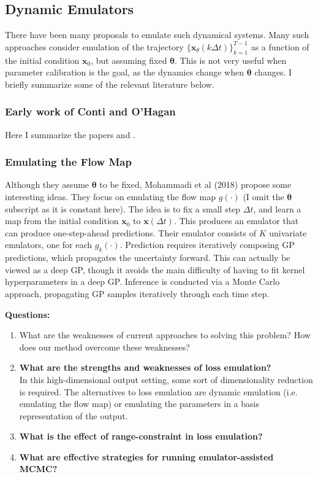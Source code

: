 \documentclass[12pt]{article}
\newcommand{\btheta}{\boldsymbol{\theta}}
\newcommand{\bx}{\mathbf{x}}
\begin{document}
 
 \subsection{Dynamic Emulators}
 There have been many proposals to emulate such dynamical systems. Many such approaches consider emulation of the trajectory $\{\bx_\theta(k\Delta t)\}_{k = 1}^{T-1}$ as a function of 
 the initial condition $\bx_0$, but assuming fixed $\btheta$. This is not very useful when parameter calibration is the goal, as the dynamics change when $\btheta$ changes. I briefly summarize some 
 of the relevant literature below. 
 
 \subsubsection{Early work of Conti and O'Hagan}
 Here I summarize the papers \cite{10.1093/biomet/asp028} and \cite{CONTI2010640}. 
 
\subsubsection{Emulating the Flow Map}
Although they assume $\btheta$ to be fixed, Mohammadi et al (2018) \cite{MOHAMMADI2019178} propose some interesting ideas. They focus on emulating the flow map $g(\cdot)$ 
(I omit the $\btheta$ subscript as it is constant here). The idea is to fix a small step $\Delta t$, and learn a map from the initial condition $\bx_0$ to $\bx(\Delta t)$. This produces an emulator 
that can produce one-step-ahead predictions. Their emulator consists of $K$ univariate emulators, one for each $g_k(\cdot)$. Prediction requires iteratively composing GP predictions, which 
propagates the uncertainty forward. This can actually be viewed as a deep GP, though it avoids the main difficulty of having to fit kernel hyperparameters in a deep GP. Inference is conducted 
via a Monte Carlo approach, propagating GP samples iteratively through each time step. 

\bigskip
\textbf{Questions:} 
\begin{enumerate}
\item What are the weaknesses of current approaches to solving this problem? How does our method overcome these weaknesses? 
\item \textbf{What are the strengths and weaknesses of loss emulation?} \\ 
In this high-dimensional output setting, some sort of dimensionality reduction is required. The alternatives to loss emulation are dynamic emulation (i.e. emulating the flow map) or 
emulating the parameters in a basis representation of the output. 
\item \textbf{What is the effect of range-constraint in loss emulation?} 
\item \textbf{What are effective strategies for running emulator-assisted MCMC?}
\end{enumerate}
\end{document}
